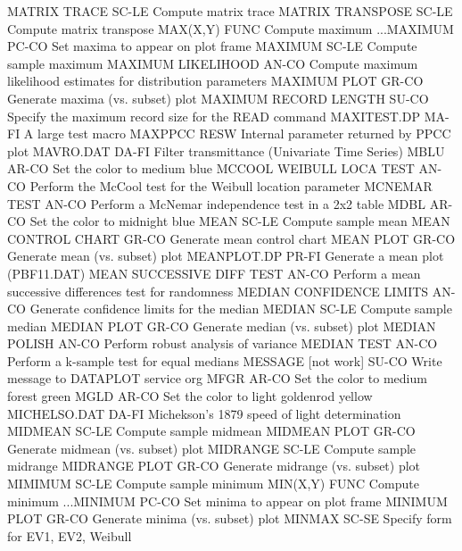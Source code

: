 MATRIX TRACE                SC-LE Compute matrix trace
MATRIX TRANSPOSE            SC-LE Compute matrix transpose
MAX(X,Y)                    FUNC  Compute maximum
...MAXIMUM                  PC-CO Set maxima to appear on plot frame
MAXIMUM                     SC-LE Compute sample maximum
MAXIMUM LIKELIHOOD          AN-CO Compute maximum likelihood estimates for distribution parameters
MAXIMUM PLOT                GR-CO Generate maxima (vs. subset) plot
MAXIMUM RECORD LENGTH       SU-CO Specify the maximum record size for the READ command
MAXITEST.DP                 MA-FI A large test macro
MAXPPCC                     RESW Internal parameter returned by PPCC plot
MAVRO.DAT                   DA-FI Filter transmittance (Univariate Time Series)
MBLU                        AR-CO Set the color to medium blue
MCCOOL WEIBULL LOCA TEST    AN-CO Perform the McCool test for the Weibull location parameter
MCNEMAR TEST                AN-CO Perform a McNemar independence test in a 2x2 table
MDBL                        AR-CO Set the color to midnight blue
MEAN                        SC-LE Compute sample mean
MEAN CONTROL CHART          GR-CO Generate mean control chart
MEAN PLOT                   GR-CO Generate mean (vs. subset) plot
MEANPLOT.DP                 PR-FI Generate a mean plot (PBF11.DAT)
MEAN SUCCESSIVE DIFF TEST   AN-CO Perform a mean successive differences test for randomness
MEDIAN CONFIDENCE LIMITS    AN-CO Generate confidence limits for the median
MEDIAN                      SC-LE Compute sample median
MEDIAN PLOT                 GR-CO Generate median (vs. subset) plot
MEDIAN POLISH               AN-CO Perform robust analysis of variance
MEDIAN TEST                 AN-CO Perform a k-sample test for equal medians
MESSAGE      [not work]     SU-CO Write message to DATAPLOT service org
MFGR                        AR-CO Set the color to medium forest green
MGLD                        AR-CO Set the color to light goldenrod yellow 
MICHELSO.DAT                DA-FI Michekson's 1879 speed of light determination
MIDMEAN                     SC-LE Compute sample midmean
MIDMEAN PLOT                GR-CO Generate midmean (vs. subset) plot
MIDRANGE                    SC-LE Compute sample midrange
MIDRANGE PLOT               GR-CO Generate midrange (vs. subset) plot
MIMIMUM                     SC-LE Compute sample minimum
MIN(X,Y)                    FUNC  Compute minimum
...MINIMUM                  PC-CO Set minima to appear on plot frame
MINIMUM PLOT                GR-CO Generate minima (vs. subset) plot
MINMAX                      SC-SE Specify form for EV1, EV2, Weibull
